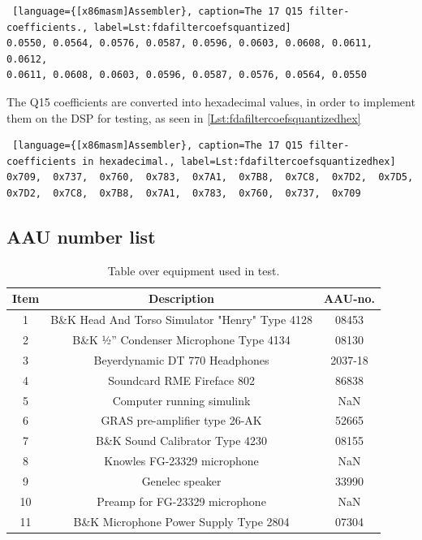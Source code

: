 \begin{lstlisting} [language={[x86masm]Assembler}, caption=The 17 Q15 filter-coefficients., label=Lst:fdafiltercoefsquantized]
0.0550,	0.0564,	0.0576,	0.0587,	0.0596,	0.0603,	0.0608,	0.0611,	0.0612,
0.0611,	0.0608,	0.0603,	0.0596,	0.0587,	0.0576,	0.0564,	0.0550
\end{lstlisting}

The Q15 coefficients are converted into hexadecimal values, in order to implement them on the DSP for testing, as seen in \autoref{Lst:fdafiltercoefsquantizedhex} 

\begin{lstlisting} [language={[x86masm]Assembler}, caption=The 17 Q15 filter-coefficients in hexadecimal., label=Lst:fdafiltercoefsquantizedhex]
0x709,	0x737,	0x760,	0x783,	0x7A1,	0x7B8,	0x7C8,	0x7D2,	0x7D5,
0x7D2,	0x7C8,	0x7B8,	0x7A1,	0x783,	0x760,	0x737,	0x709
\end{lstlisting}


\subsection{AAU number list}
\begin{table}[H]
	\centering
	\begin{tabular}{ c c c } \toprule
	{Item}	& {Description} 						& {AAU-no}. \\ \bottomrule 
	1	&	B\&K Head And Torso Simulator "Henry" Type 4128	& 08453	\\
	2	&	B\&K ½'' Condenser Microphone Type 4134 	& 08130		\\
	3	&	Beyerdynamic DT 770 Headphones				& 2037-18		\\
	4	&	Soundcard RME Fireface 802					& 86838		\\
	5	&	Computer running simulink		& NaN		\\
	6	&	GRAS pre-amplifier type 26-AK			& 52665		\\
	7	&	B\&K Sound Calibrator Type 4230				& 08155		\\ 
	8	&	Knowles FG-23329 microphone					& NaN		\\
	9	&	Genelec speaker								& 33990		\\ 
	10	&	Preamp for FG-23329  microphone	& NaN\\
	11	& 	B\&K Microphone Power Supply Type 2804		& 07304		\\
	\bottomrule
	\end{tabular}
	\caption{Table over equipment used in test.}
	\label{tab:UsedEquipmentListningFIRTest}
\end{table}

